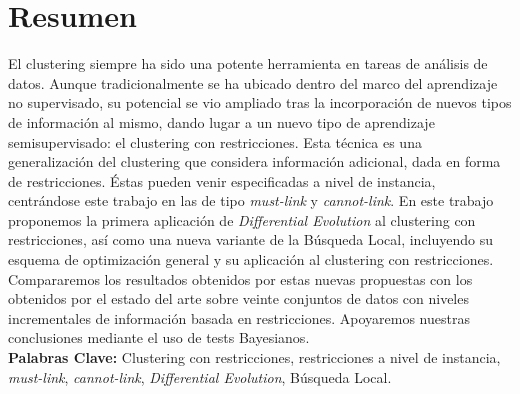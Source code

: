 \begingroup

\chapter*{Resumen}

El clustering siempre ha sido una potente herramienta en tareas de análisis de datos. Aunque tradicionalmente se ha ubicado dentro del marco del aprendizaje no supervisado, su potencial se vio ampliado tras la incorporación de nuevos tipos de información al mismo, dando lugar a un nuevo tipo de aprendizaje semisupervisado: el clustering con restricciones. Esta técnica es una generalización del clustering que considera información adicional, dada en forma de restricciones. Éstas pueden venir especificadas a nivel de instancia, centrándose este trabajo en las de tipo \textit{must-link} y \textit{cannot-link}. En este trabajo proponemos la primera aplicación de \textit{Differential Evolution} al clustering con restricciones, así como una nueva variante de la Búsqueda Local, incluyendo su esquema de optimización general y su aplicación al clustering con restricciones. Compararemos los resultados obtenidos por estas nuevas propuestas con los obtenidos por el estado del arte sobre veinte conjuntos de datos con niveles incrementales de información basada en restricciones. Apoyaremos nuestras conclusiones mediante el uso de tests Bayesianos. \\


\noindent\textbf{Palabras Clave:} Clustering con restricciones, restricciones a nivel de instancia, \textit{must-link}, \textit{cannot-link}, \textit{Differential Evolution}, Búsqueda Local.


\endgroup